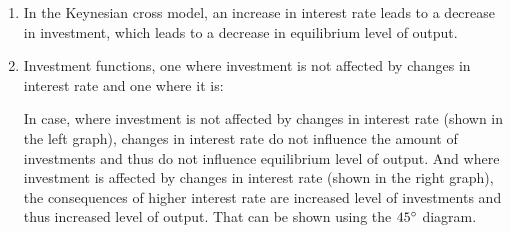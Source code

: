 \documentclass[a4paper,12pt]{article} %
\begin{document}
\begin{enumerate}
\begin{enumerate} [label=\arabic*)]
\item In the Keynesian cross model, an increase in interest rate leads to a decrease in investment, which leads to a decrease in equilibrium level of output.  

\item Investment functions, one where investment is not affected by changes in
interest rate and one where it is:



In case,  where investment is not affected by changes in
interest rate (shown in the left graph), changes in interest rate do not influence the amount of investments and thus do not influence equilibrium level of output.   And where investment is affected by changes in
interest rate (shown in the right graph),  the consequences of higher interest rate are increased level of investments and thus increased level of output. 
That can be shown using the $ 45\degree $  diagram.


\end{enumerate}
\end{enumerate}
\end{document}
